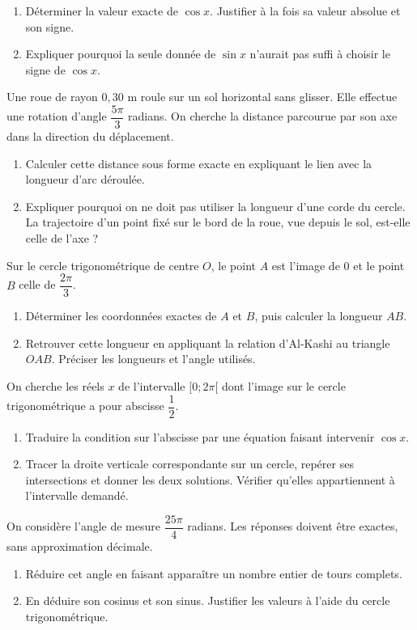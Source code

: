 \begin{enumerate}[label=\arabic*.]
\item Déterminer la valeur exacte de $\cos x$. Justifier à la fois sa valeur absolue et son signe.
\item Expliquer pourquoi la seule donnée de $\sin x$ n’aurait pas suffi à choisir le signe de $\cos x$.
\end{enumerate}
Une roue de rayon $0{,}30$ m roule sur un sol horizontal sans glisser. Elle effectue une rotation d’angle $\dfrac{5\pi}{3}$ radians. On cherche la distance parcourue par son axe dans la direction du déplacement.
\begin{enumerate}[label=\arabic*.]
\item Calculer cette distance sous forme exacte en expliquant le lien avec la longueur d’arc déroulée.
\item Expliquer pourquoi on ne doit pas utiliser la longueur d’une corde du cercle. La trajectoire d’un point fixé sur le bord de la roue, vue depuis le sol, est-elle celle de l’axe ?
\end{enumerate}
Sur le cercle trigonométrique de centre $O$, le point $A$ est l’image de 0 et le point $B$ celle de $\dfrac{2\pi}{3}$.
\begin{enumerate}[label=\arabic*.]
\item Déterminer les coordonnées exactes de $A$ et $B$, puis calculer la longueur $AB$.
\item Retrouver cette longueur en appliquant la relation d’Al-Kashi au triangle $OAB$. Préciser les longueurs et l’angle utilisés.
\end{enumerate}
On cherche les réels $x$ de l’intervalle $[0;2\pi[$ dont l’image sur le cercle trigonométrique a pour abscisse $\dfrac12$.
\begin{enumerate}[label=\arabic*.]
\item Traduire la condition sur l’abscisse par une équation faisant intervenir $\cos x$.
\item Tracer la droite verticale correspondante sur un cercle, repérer ses intersections et donner les deux solutions. Vérifier qu’elles appartiennent à l’intervalle demandé.
\end{enumerate}
On considère l’angle de mesure $\dfrac{25\pi}{4}$ radians. Les réponses doivent être exactes, sans approximation décimale.
\begin{enumerate}[label=\arabic*.]
\item Réduire cet angle en faisant apparaître un nombre entier de tours complets.
\item En déduire son cosinus et son sinus. Justifier les valeurs à l’aide du cercle trigonométrique.
\end{enumerate}
